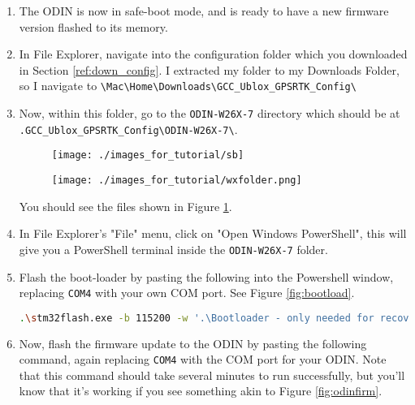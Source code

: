 \documentclass{article}%
\begin{document}
\begin{appendices}
\begin{enumerate}
	\item The ODIN is now in safe-boot mode, and is ready to have a new firmware version flashed to its memory.
	\item In File Explorer, navigate into the configuration folder which you downloaded in Section \ref{ref:down_config}.  I extracted my folder to my Downloads Folder, so I navigate to \texttt{\textbackslash Mac\textbackslash Home\textbackslash Downloads\textbackslash GCC\_Ublox\_GPSRTK\_Config\textbackslash }
	\item Now, within this folder, go to the \texttt{ODIN-W26X-7} directory which should be at\\ \texttt{.GCC\_Ublox\_GPSRTK\_Config\textbackslash ODIN-W26X-7\textbackslash }.
	
	
	\begin{figure}
	\centering
	\begin{minipage}{.5\textwidth}
	  \centering
	  \texttt{[image: ./images\_for\_tutorial/sb]}
	  \label{fig:sb}
	\end{minipage}%
	\begin{minipage}{.5\textwidth}
	  \centering
	  \texttt{[image: ./images\_for\_tutorial/wxfolder.png]}
	  \label{fig:wxfolder}
	\end{minipage}
	\end{figure}
	
		You should see the files shown in Figure \ref{fig:wxfolder}.
	\item In File Explorer's "File" menu, click on "Open Windows PowerShell", this will give you a PowerShell terminal inside the \texttt{ODIN-W26X-7} folder.
	\item Flash the boot-loader by pasting the following into the Powershell window, replacing \texttt{COM4} with your own COM port. See Figure \ref{fig:bootload}.
	\begin{lstlisting}[language=bash]
		.\stm32flash.exe -b 115200 -w '.\Bootloader - only needed for recovery\ODIN-W2-BOOT-v0.8.2.bin' -s 0x8000000 COM4
	\end{lstlisting}
	
	\item Now, flash the firmware update to the ODIN by pasting the following command, again replacing \texttt{COM4} with the COM port for your ODIN.  Note that this command should take several minutes to run successfully, but you'll know that it's working if you see something akin to Figure \ref{fig:odinfirm}.


\end{enumerate}
\end{appendices}
\end{document}
